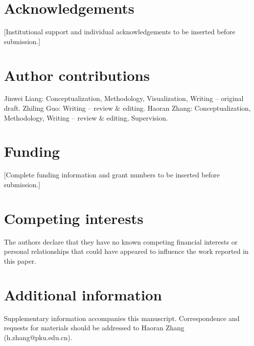 \documentclass[pdflatex,sn-nature]{sn-jnl}
\begin{document}
\section*{Acknowledgements}

[Institutional support and individual acknowledgements to be inserted before submission.]

\section*{Author contributions}

Jinwei Liang: Conceptualization, Methodology, Visualization, Writing -- original draft. Zhiling Guo: Writing -- review \& editing. Haoran Zhang: Conceptualization, Methodology, Writing -- review \& editing, Supervision.

\section*{Funding}

[Complete funding information and grant numbers to be inserted before submission.]

\section*{Competing interests}

The authors declare that they have no known competing financial interests or personal relationships that could have appeared to influence the work reported in this paper.

\section*{Additional information}

Supplementary information accompanies this manuscript. Correspondence and requests for materials should be addressed to Haoran Zhang (h.zhang@pku.edu.cn).

\clearpage
\end{document}
